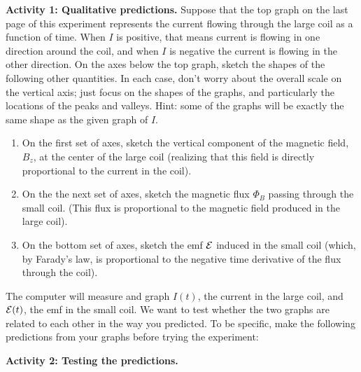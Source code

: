 {\bf Activity 1: Qualitative predictions.} Suppose that the top graph on the 
last page of this experiment represents the current flowing through the large 
coil as a function of time. When $I$ is positive, that means current is 
flowing in one direction around the coil, and when $I$ is negative the current 
is flowing in the other direction. On the axes below the top graph, sketch the 
shapes of the following other quantities.
In each case, don't worry about the overall scale on the vertical axis;
just focus on the shapes of the graphs, and particularly the locations
of the peaks and valleys.  Hint: some of the graphs will be exactly
the same shape as the given graph of $I$.

\begin{enumerate}
\item
On the first set of axes, sketch the vertical component of the magnetic field,
$B_z$, at the center of the large coil (realizing that this field is directly
proportional to the current in the coil).
\item On the the next set of axes, sketch the magnetic flux $\Phi_ B$ passing
through the small coil. (This flux is proportional to the magnetic field 
produced in the large coil).
\item On the bottom set of axes, sketch the emf ${\cal E}$ induced in the small
coil (which, by Farady's law, is proportional to the negative time derivative 
of the flux through the coil).
\end{enumerate}

The computer will measure and graph
$I(t)$, the current in the large coil, and ${\cal E}(t)$,
the emf in the small coil.  We want to test whether the two graphs are related
to each other in the way you predicted.  To be specific, make the following
predictions from your graphs before trying the experiment:

\newpage


\bigskip\bigskip

{\bf Activity 2: Testing the predictions.}

